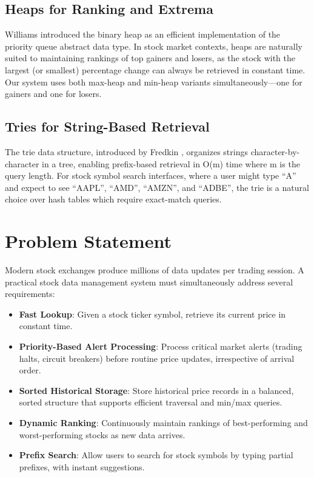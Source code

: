 \documentclass[conference]{IEEEtran}
\begin{document}
\subsection{Heaps for Ranking and Extrema}

Williams \cite{b7} introduced the binary heap as an efficient implementation of the priority queue abstract data type. In stock market contexts, heaps are naturally suited to maintaining rankings of top gainers and losers, as the stock with the largest (or smallest) percentage change can always be retrieved in constant time. Our system uses both max-heap and min-heap variants simultaneously---one for gainers and one for losers.

\subsection{Tries for String-Based Retrieval}

The trie data structure, introduced by Fredkin \cite{b8}, organizes strings character-by-character in a tree, enabling prefix-based retrieval in O(m) time where m is the query length. For stock symbol search interfaces, where a user might type ``A'' and expect to see ``AAPL'', ``AMD'', ``AMZN'', and ``ADBE'', the trie is a natural choice over hash tables which require exact-match queries.

\section{Problem Statement}

Modern stock exchanges produce millions of data updates per trading session. A practical stock data management system must simultaneously address several requirements:

\begin{itemize}
\item \textbf{Fast Lookup}: Given a stock ticker symbol, retrieve its current price in constant time.
\item \textbf{Priority-Based Alert Processing}: Process critical market alerts (trading halts, circuit breakers) before routine price updates, irrespective of arrival order.
\item \textbf{Sorted Historical Storage}: Store historical price records in a balanced, sorted structure that supports efficient traversal and min/max queries.
\item \textbf{Dynamic Ranking}: Continuously maintain rankings of best-performing and worst-performing stocks as new data arrives.
\item \textbf{Prefix Search}: Allow users to search for stock symbols by typing partial prefixes, with instant suggestions.
\end{itemize}
\end{document}
